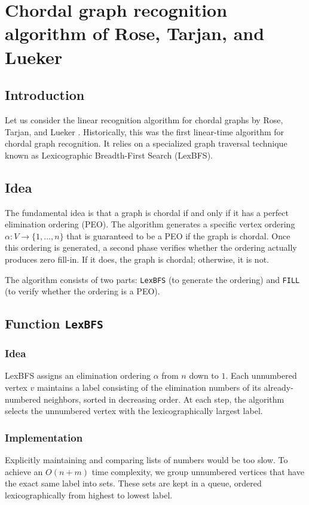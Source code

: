 \chapter{Chordal graph recognition algorithm of Rose, Tarjan, and Lueker}

\section{Introduction}
Let us consider the linear recognition algorithm for chordal graphs by Rose, Tarjan, and Lueker \cite{RoseTarjanLueker1976}. Historically, this was the first linear-time algorithm for chordal graph recognition. It relies on a specialized graph traversal technique known as Lexicographic Breadth-First Search (LexBFS). 

\section{Idea}
The fundamental idea is that a graph is chordal if and only if it has a perfect elimination ordering (PEO). The algorithm generates a specific vertex ordering $\alpha \colon V \to \{1, \dots, n\}$ that is guaranteed to be a PEO if the graph is chordal. Once this ordering is generated, a second phase verifies whether the ordering actually produces zero fill-in. If it does, the graph is chordal; otherwise, it is not.

The algorithm consists of two parts: \texttt{LexBFS} (to generate the ordering) and \texttt{FILL} (to verify whether the ordering is a PEO).

\section{Function \texttt{LexBFS}}

\subsection{Idea}
LexBFS assigns an elimination ordering $\alpha$ from $n$ down to $1$. Each unnumbered vertex $v$ maintains a label consisting of the elimination numbers of its already-numbered neighbors, sorted in decreasing order. At each step, the algorithm selects the unnumbered vertex with the lexicographically largest label.

\subsection{Implementation}
Explicitly maintaining and comparing lists of numbers would be too slow. To achieve an $O(n + m)$ time complexity, we group unnumbered vertices that have the exact same label into sets. These sets are kept in a queue, ordered lexicographically from highest to lowest label. 

